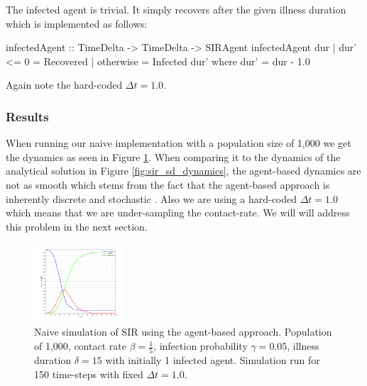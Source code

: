 The infected agent is trivial. It simply recovers after the given illness duration which is implemented as follows:

\begin{HaskellCode}
infectedAgent :: TimeDelta -> TimeDelta -> SIRAgent
infectedAgent dur
    | dur' <= 0 = Recovered
    | otherwise = Infected dur'
  where
    dur' = dur - 1.0  
\end{HaskellCode}

Again note the hard-coded $\Delta t = 1.0$.

\subsubsection{Results}
When running our naive implementation with a population size of 1,000 we get the dynamics as seen in Figure \ref{fig:sir_abs_dynamics_naive}. When comparing it to the dynamics of the analytical solution in Figure \ref{fig:sir_sd_dynamics}, the agent-based dynamics are not as smooth which stems from the fact that the agent-based approach is inherently discrete and stochastic \cite{macal_agent-based_2010}. Also we are using a hard-coded $\Delta t = 1.0$ which means that we are under-sampling the contact-rate. We will will address this problem in the next section.

\begin{figure}
	\centering
	\includegraphics[width=0.30\textwidth, angle=0]{./fig/step1_randmonad/SIR_1000agents_150t_1dt.png}
	\caption{Naive simulation of SIR using the agent-based approach. Population of 1,000, contact rate $\beta = \frac{1}{5}$, infection probability $\gamma = 0.05$, illness duration $\delta = 15$ with initially 1 infected agent. Simulation run for 150 time-steps with fixed $\Delta t = 1.0$.}
	\label{fig:sir_abs_dynamics_naive}
\end{figure}

    	
